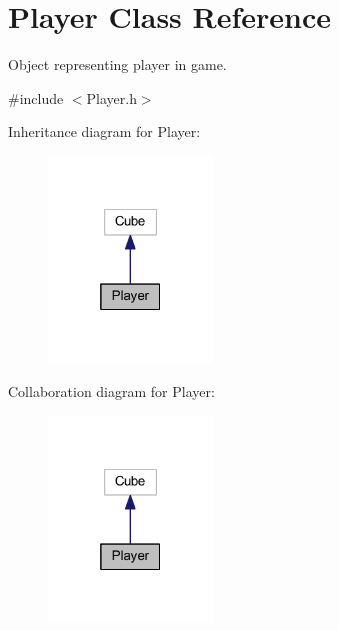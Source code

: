 \hypertarget{class_player}{}\section{Player Class Reference}
\label{class_player}


Object representing player in game.  




{\ttfamily \#include $<$Player.\+h$>$}



Inheritance diagram for Player\+:
\nopagebreak
\begin{figure}[H]
\begin{center}
\leavevmode
\includegraphics[width=124pt]{class_player__inherit__graph}
\end{center}
\end{figure}


Collaboration diagram for Player\+:
\nopagebreak
\begin{figure}[H]
\begin{center}
\leavevmode
\includegraphics[width=124pt]{class_player__coll__graph}
\end{center}
\end{figure}
